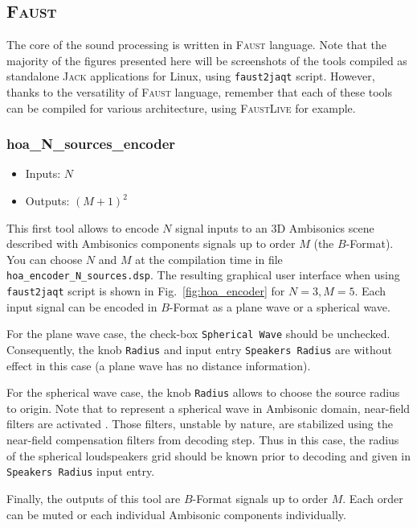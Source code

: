 \documentclass[10pt,a4paper]{article}
\begin{document}
\subsection{\textsc{Faust}}
The core of the sound processing is written in \textsc{Faust} language. Note that the majority of the figures presented here will be screenshots of the tools compiled as standalone \textsc{Jack} applications for Linux, using \lstinline'faust2jaqt' script. However, thanks to the versatility of \textsc{Faust} language, remember that each of these tools can be compiled for various architecture, using \textsc{FaustLive} for example. 

\pagebreak
\subsubsection{hoa\_N\_sources\_encoder}
\label{sec:hoa_encoder}
\begin{itemize}
\item Inputs: $N$
\item Outputs: $(M+1)^2$
\end{itemize}

This first tool allows to encode $N$ signal inputs to an 3D Ambisonics scene described with Ambisonics components signals up to order $M$ (the $B$-Format). You can choose $N$ and $M$ at the compilation time in file \lstinline'hoa_encoder_N_sources.dsp'. The resulting graphical user interface when using \lstinline'faust2jaqt' script is shown in Fig.~\ref{fig:hoa_encoder} for $N=3, M=5$.
Each input signal can be encoded in $B$-Format as a plane wave or a spherical wave. 

For the plane wave case, the check-box \lstinline'Spherical Wave' should be unchecked. Consequently, the knob \lstinline'Radius' and input entry \lstinline'Speakers Radius' are without effect in this case (a plane wave has no distance information).

For the spherical wave case, the knob \lstinline'Radius' allows to choose the source radius to origin. Note that to represent a spherical wave in Ambisonic domain, near-field filters are activated \cite{daniel2003spatial,lecomte2015real}. Those filters, unstable by nature, are stabilized using the near-field compensation filters from decoding step. Thus in this case, the radius of the spherical loudspeakers grid should be known prior to decoding and given in \lstinline'Speakers Radius' input entry.

Finally, the outputs of this tool are $B$-Format signals up to order $M$. Each order can be muted or each individual Ambisonic components individually.
\end{document}
